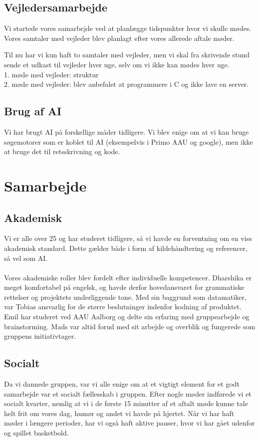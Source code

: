 \documentclass[12pt,a4paper]{article}
\begin{document}
\subsection{Vejledersamarbejde}
Vi startede vores samarbejde ved at planlægge tidspunkter hvor vi skulle mødes. Vores samtaler med vejleder blev planlagt efter vores allerede aftale møder. 

Til nu har vi kun haft to samtaler med vejleder, men vi skal fra skrivende stund sende et udkast til vejleder hver uge, selv om vi ikke kan mødes hver uge. \\
1. møde med vejleder: struktur \\
2. møde med vejleder: blev anbefalet at programmere i C og ikke lave en server. 

\subsection{Brug af AI}
Vi har brugt AI på forskellige måder tidligere. Vi blev enige om at vi kan bruge søgemotorer som er koblet til AI (eksempelvis i Primo AAU og google), men ikke at bruge det til retsskrivning og kode. 
\clearpage

\section{Samarbejde}
\subsection{Akademisk}
Vi er alle over 25 og har studeret tidligere, så vi havde en forventning om en viss akademisk standard. Dette gælder både i form af kildehåndtering og referencer, så vel som AI.\\ \\
Vores akademiske roller blev fordelt efter individuelle kompetencer. Dharshika er meget komfortabel på engelsk, og havde derfor hovedansvaret for grammatiske rettelser og projektets underliggende tone. Med sin baggrund som datamatiker, var Tobias ansvarlig for de større beslutninger indenfor kodning af produktet. Emil har studeret ved AAU Aalborg og delte sin erfaring med gruppearbejde og brainstorming. Mads var altid forud med sit arbejde og overblik og fungerede som gruppens initiativtager. 



\subsection{Socialt}
Da vi dannede gruppen, var vi alle enige om at et vigtigt element for et godt samarbejde var et socialt fællesskab i gruppen. Efter nogle møder indførede vi et socialt kvarter, nemlig at vi i de første 15 minutter af et aftalt møde kunne tale helt frit om vores dag, humør og andet vi havde på hjertet. Når vi har haft møder i længere perioder, har vi også haft aktive pauser, hvor vi har gået udenfor og spillet basketbold.  
\end{document}
